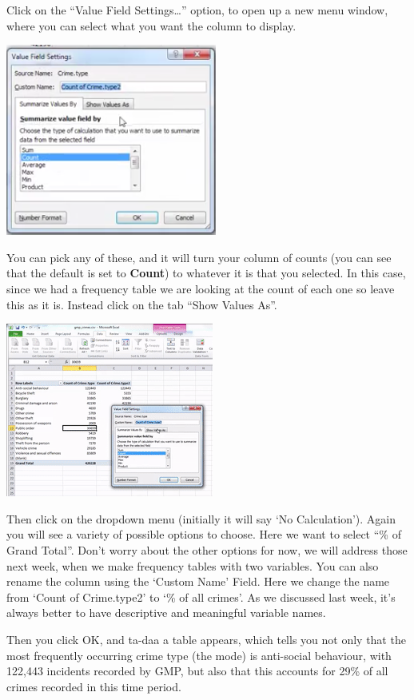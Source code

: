 \documentclass[
]{book}
\begin{document}
Click on the ``Value Field Settings\ldots{}'' option, to open up a new menu window, where you can select what you want the column to display.

\includegraphics{imgs/vfs_menu.png}

You can pick any of these, and it will turn your column of counts (you can see that the default is set to \textbf{Count}) to whatever it is that you selected. In this case, since we had a frequency table we are looking at the count of each one so leave this as it is. Instead click on the tab ``Show Values As''.

\includegraphics{imgs/perc_menu.gif}

Then click on the dropdown menu (initially it will say `No Calculation'). Again you will see a variety of possible options to choose. Here we want to select ``\% of Grand Total''. Don't worry about the other options for now, we will address those next week, when we make frequency tables with two variables. You can also rename the column using the `Custom Name' Field. Here we change the name from `Count of Crime.type2' to `\% of all crimes'. As we discussed last week, it's always better to have descriptive and meaningful variable names.

Then you click OK, and ta-daa a table appears, which tells you not only that the most frequently occurring crime type (the mode) is anti-social behaviour, with 122,443 incidents recorded by GMP, but also that this accounts for 29\% of all crimes recorded in this time period.
\end{document}
